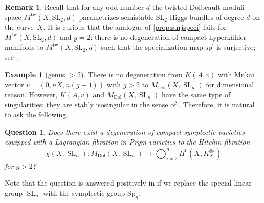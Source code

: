 \documentclass[JEP,XML,SOM,Unicode, NoEqCountersInSection,NoFloatCountersInSection,published]{cedram}
\newtheorem*{question*}{Question}
\theoremstyle{definition}
\newtheorem{exa}[thm]{Example}
\newtheorem{rmk}[thm]{Remark}
\newcommand{\Sl}{\operatorname{SL}}
\newcommand{\spmap}{\mathrm{sp}^{!}}
\newcommand{\MDolSl}{{M}_{\mathrm{Dol}}(X, \Sl_n)}
\begin{document}
\begin{rmk}\label{rmk:smoothvssingular} Recall that for any odd number $d$ the twisted Dolbeault moduli space $M^{\mathrm{tw}}(X, \mathrm{SL}_2, d)$ parametrizes semistable $\mathrm{SL}_2$-Higgs bundles of degree $d$ on the curve~$X$. It is curious that the analogue of \cref{prop:surjspeci} fails for $M^{\mathrm{tw}}(X, \mathrm{SL}_2,d)$ and $g=2$: there is no degeneration of compact hyperkähler manifolds to $M^{\mathrm{tw}}(X, \mathrm{SL}_2, d)$ such that the specialization map $\spmap$ is surjective; see \cite[Prop.\,4.3]{deCataldoMaulikShen2020}.
\end{rmk}

\begin{exa}[genus $>2$] There is no degeneration from $K(A,v)$ with Mukai vector $v=(0,nX, n(g-1))$ with $g>2$ to $\MDolSl$ for dimensional reason. However, $K(A,v)$ and $\MDolSl$ have the same type of singularities: they are stably isosingular in the sense of \cite[Def.\,2.6 \& Th.\,2.11]{Mauri2021}. Therefore, it is natural to ask the following.
\begin{question*}
Does there exist a degeneration of compact symplectic varieties equipped with a Lagrangian fibration in Prym varieties to the Hitchin fibration
\[
\chi(X,\Sl_n)\colon \MDolSl \to \bigoplus^{n}_{i=2} H^0(X, K_X^{\otimes i})
\]
for $g>2$?
\end{question*}

Note that the question is answered positively in \cite{SawonShen2021} if we replace the special linear group $\Sl_n$ with the symplectic group $\mathrm{Sp}_n$.
\end{exa}

\backmatter


\end{document}
